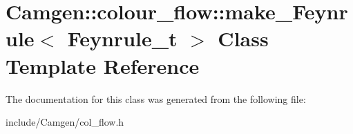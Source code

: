 \hypertarget{a00345}{}\section{Camgen\+:\+:colour\+\_\+flow\+:\+:make\+\_\+\+Feynrule$<$ Feynrule\+\_\+t $>$ Class Template Reference}
\label{a00345}


The documentation for this class was generated from the following file\+:\begin{DoxyCompactItemize}
\item 
include/\+Camgen/col\+\_\+flow.\+h\end{DoxyCompactItemize}

